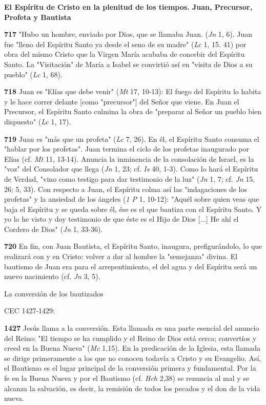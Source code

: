 \documentclass[]{article}
\begin{document}
\textbf{El Espíritu de Cristo en la plenitud de los tiempos. Juan,
Precursor, Profeta y Bautista}

\textbf{717} "Hubo un hombre, enviado por Dios, que se llamaba Juan.
(\emph{Jn} 1, 6). Juan fue "lleno del Espíritu Santo ya desde el seno de
su madre" (\emph{Lc} 1, 15. 41) por obra del mismo Cristo que la Virgen
María acababa de concebir del Espíritu Santo. La "Visitación" de María a
Isabel se convirtió así en "visita de Dios a su pueblo" (\emph{Lc} 1,
68).

\textbf{718} Juan es "Elías que debe venir" (\emph{Mt} 17, 10-13): El
fuego del Espíritu lo habita y le hace correr delante {[}como
"precursor"{]} del Señor que viene. En Juan el Precursor, el Espíritu
Santo culmina la obra de "preparar al Señor un pueblo bien dispuesto"
(\emph{Lc} 1, 17).

\textbf{719} Juan es "más que un profeta" (\emph{Lc} 7, 26). En él, el
Espíritu Santo consuma el "hablar por los profetas". Juan termina el
ciclo de los profetas inaugurado por Elías (cf. \emph{Mt} 11, 13-14).
Anuncia la inminencia de la consolación de Israel, es la "voz" del
Consolador que llega (\emph{Jn} 1, 23; cf. \emph{Is} 40, 1-3). Como lo
hará el Espíritu de Verdad, "vino como testigo para dar testimonio de la
luz" (\emph{Jn} 1, 7; cf. \emph{Jn} 15, 26; 5, 33). Con respecto a Juan,
el Espíritu colma así las "indagaciones de los profetas" y la ansiedad
de los ángeles (\emph{1 P} 1, 10-12): "Aquél sobre quien veas que baja
el Espíritu y se queda sobre él, ése es el que bautiza con el Espíritu
Santo. Y yo lo he visto y doy testimonio de que éste es el Hijo de Dios
{[}...{]} He ahí el Cordero de Dios" (\emph{Jn} 1, 33-36).

\textbf{720} En fin, con Juan Bautista, el Espíritu Santo, inaugura,
prefigurándolo, lo que realizará con y en Cristo: volver a dar al hombre
la "semejanza" divina. El bautismo de Juan era para el arrepentimiento,
el del agua y del Espíritu será un nuevo nacimiento (cf. \emph{Jn} 3,
5).

La conversión de los bautizados

CEC 1427-1429:

\textbf{1427} Jesús llama a la conversión. Esta llamada es una parte
esencial del anuncio del Reino: "El tiempo se ha cumplido y el Reino de
Dios está cerca; convertíos y creed en la Buena Nueva" (\emph{Mc} 1,15).
En la predicación de la Iglesia, esta llamada se dirige primeramente a
los que no conocen todavía a Cristo y su Evangelio. Así, el Bautismo es
el lugar principal de la conversión primera y fundamental. Por la fe en
la Buena Nueva y por el Bautismo (cf. \emph{Hch} 2,38) se renuncia al
mal y se alcanza la salvación, es decir, la remisión de todos los
pecados y el don de la vida nueva.
\end{document}

